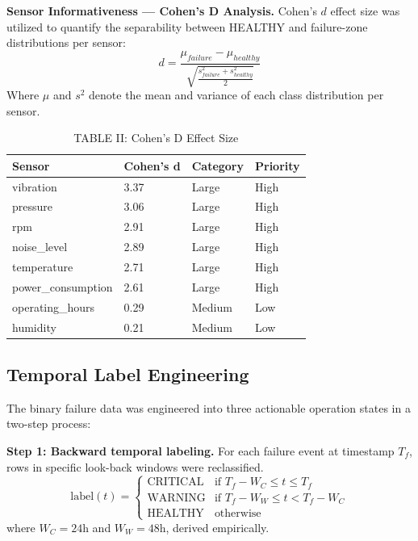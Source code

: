 \documentclass[conference]{IEEEtran}
\begin{document}
\textbf{Sensor Informativeness — Cohen's D Analysis.} Cohen's $d$ effect size was utilized to quantify the separability between HEALTHY and failure-zone distributions per sensor:
\begin{equation}
d = \frac{\mu_{failure} - \mu_{healthy}}{\sqrt{\frac{s^2_{failure} + s^2_{healthy}}{2}}}
\label{eq:cohend}
\end{equation}
Where $\mu$ and $s^2$ denote the mean and variance of each class distribution per sensor.

\begin{table}[htbp]
\caption{TABLE II: Cohen's D Effect Size}
\centering
\begin{tabular}{llll}
\hline
\textbf{Sensor} & \textbf{Cohen's d} & \textbf{Category} & \textbf{Priority} \\
\hline
vibration & 3.37 & Large & High \\
pressure & 3.06 & Large & High \\
rpm & 2.91 & Large & High \\
noise\_level & 2.89 & Large & High \\
temperature & 2.71 & Large & High \\
power\_consumption & 2.61 & Large & High \\
operating\_hours & 0.29 & Medium & Low \\
humidity & 0.21 & Medium & Low \\
\hline
\end{tabular}
\label{tab:cohend}
\end{table}

\subsection{Temporal Label Engineering}
The binary failure data was engineered into three actionable operation states in a two-step process:

\textbf{Step 1: Backward temporal labeling.}
For each failure event at timestamp $T_f$, rows in specific look-back windows were reclassified. 
\begin{equation}
\text{label}(t) = \begin{cases}
\text{CRITICAL} & \text{if } T_f - W_C \leq t \leq T_f \\
\text{WARNING}  & \text{if } T_f - W_W \leq t < T_f - W_C \\
\text{HEALTHY}  & \text{otherwise}
\end{cases}
\label{eq:labeling}
\end{equation}
where $W_C = 24$h and $W_W = 48$h, derived empirically.
\end{document}
